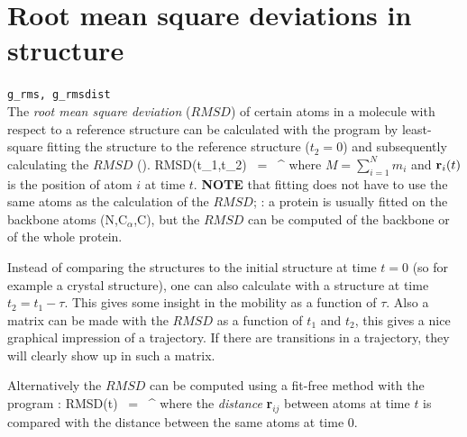 
\section{Root mean square deviations in structure}
\label{sec:rmsd}
{\tt g\_rms, g\_rmsdist}\\
The {\em root mean square deviation} ($RMSD$) of certain atoms in a molecule
with respect to a reference structure can be calculated with the program 
{\tt {}} by least-square fitting the structure to the reference structure
($t_2 = 0$) and subsequently calculating the $RMSD$ ().
\beq
RMSD(t_1,t_2) ~=~ \left[\frac{1}{M} \sum_{i=1}^N m_i \|{\bf r}_i(t_1)-{\bf r}_i(t_2)\|^2 \right]^{}
\label{eqn:rmsd}
\eeq
where $M = \sum_{i=1}^N m_i$ and ${\bf r}_i(t)$ is the position of atom $i$ at time $t$.
{\bf NOTE} that fitting does not have to use the same atoms as the calculation
of the $RMSD$; {\eg}: a protein is usually fitted on the backbone atoms
(N,C$_{\alpha}$,C), but the $RMSD$ can be computed of the backbone
or of the whole protein.

Instead of comparing the structures to the initial structure at time $t=0$ 
(so for example a crystal structure), one can also calculate  
with a structure at time $t_2=t_1-\tau$.
This gives some insight in the mobility as a function of $\tau$.
Also a matrix can be made with the $RMSD$ as a function of $t_1$ and $t_2$,
this gives a nice graphical impression of a trajectory.
If there are transitions in a trajectory, they will clearly show up in
such a matrix.

Alternatively the $RMSD$ can be computed using a fit-free method with the 
program {\tt {}}:
\beq
RMSD(t) ~=~     \left[\frac{1}{N^2}\sum_{i=1}^N \sum_{j=1}^N    \|{\bf r}_{ij}(t)-{\bf r}_{ij}(0)\|^2\right]^{}
\label{eqn:rmsdff}
\eeq
where the {\em distance} {\bf r}$_{ij}$ between atoms at time $t$ 
is compared with the distance between the same atoms at time $0$.

